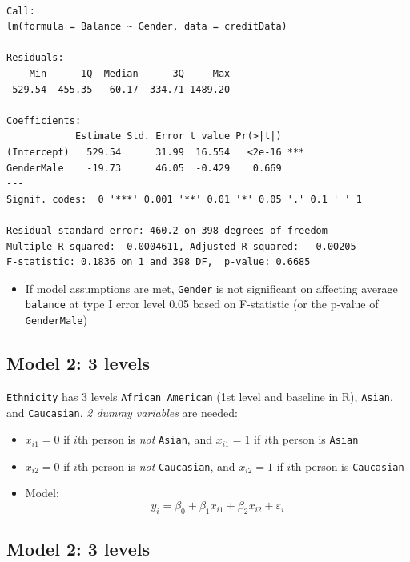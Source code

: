 \documentclass[]{article}
\providecommand{\tightlist}{%
  \setlength{\itemsep}{0pt}\setlength{\parskip}{0pt}}
\begin{document}
\begin{verbatim}

Call:
lm(formula = Balance ~ Gender, data = creditData)

Residuals:
    Min      1Q  Median      3Q     Max 
-529.54 -455.35  -60.17  334.71 1489.20 

Coefficients:
            Estimate Std. Error t value Pr(>|t|)    
(Intercept)   529.54      31.99  16.554   <2e-16 ***
GenderMale    -19.73      46.05  -0.429    0.669    
---
Signif. codes:  0 '***' 0.001 '**' 0.01 '*' 0.05 '.' 0.1 ' ' 1

Residual standard error: 460.2 on 398 degrees of freedom
Multiple R-squared:  0.0004611, Adjusted R-squared:  -0.00205 
F-statistic: 0.1836 on 1 and 398 DF,  p-value: 0.6685
\end{verbatim}

\begin{itemize}
\tightlist
\item
  If model assumptions are met, \texttt{Gender} is not significant on
  affecting average \texttt{balance} at type I error level 0.05 based on
  F-statistic (or the p-value of \texttt{GenderMale})
\end{itemize}

\subsection{Model 2: 3 levels}\label{model-2-3-levels}

\texttt{Ethnicity} has 3 levels \texttt{African\ American} (1st level
and baseline in R), \texttt{Asian}, and \texttt{Caucasian}. \emph{2
dummy variables} are needed:

\begin{itemize}
\tightlist
\item
  \(x_{i1} =0\) if \(i\)th person is \emph{not} \texttt{Asian}, and
  \(x_{i1} =1\) if \(i\)th person is \texttt{Asian}
\item
  \(x_{i2} =0\) if \(i\)th person is \emph{not} \texttt{Caucasian}, and
  \(x_{i2} =1\) if \(i\)th person is \texttt{Caucasian}
\item
  Model:
  \[y_i = \beta_0 + \beta_1 x_{i1} +\beta_2 x_{i2} + \varepsilon_i\]
\end{itemize}

\subsection{Model 2: 3 levels}\label{model-2-3-levels-1}
\end{document}
